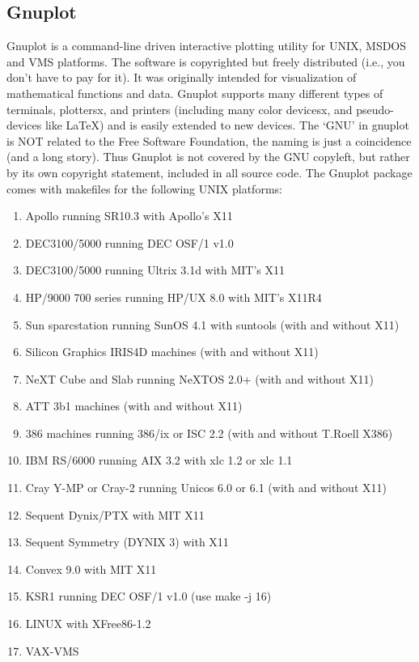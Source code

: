 \documentclass[aps,twocolumn,a4]{revtex4}
\begin{document}
\subsection{Gnuplot}
\label{gnuplot}
Gnuplot is a command-line driven interactive plotting utility
for UNIX, MSDOS and VMS platforms.  The software is copyrighted but
freely distributed (i.e., you don't have to pay for it).  It was
originally intended for
visualization of mathematical functions and data.  Gnuplot
supports many different types of terminals, plottersx, and printers
(including many color devicesx, and pseudo-devices like LaTeX) and is
easily extended to new devices. The `GNU' in gnuplot is
NOT related to the Free Software Foundation, the naming is just a
coincidence (and a long story). Thus Gnuplot is not covered by the GNU
copyleft, but rather by its own copyright statement, included in all
source code.
The Gnuplot package comes with makefiles for the following UNIX platforms:
\begin{enumerate}
\item Apollo running SR10.3 with Apollo's X11
\item DEC3100/5000 running DEC OSF/1 v1.0
\item DEC3100/5000 running Ultrix 3.1d with MIT's X11
\item HP/9000 700 series running HP/UX 8.0 with MIT's X11R4
\item Sun sparcstation running SunOS 4.1 with suntools (with and without X11)
\item Silicon Graphics IRIS4D machines (with and without X11)
\item NeXT Cube and Slab running NeXTOS 2.0+ (with and without X11)
\item ATT 3b1 machines (with and without X11)
\item 386 machines running 386/ix or ISC 2.2 (with and without T.Roell X386)
\item IBM RS/6000 running AIX 3.2 with xlc 1.2 or xlc 1.1
\item Cray Y-MP or Cray-2 running Unicos 6.0 or 6.1 (with and without X11)
\item Sequent Dynix/PTX with MIT X11
\item Sequent Symmetry (DYNIX 3) with X11
\item Convex 9.0 with MIT X11
\item KSR1 running DEC OSF/1 v1.0 (use make -j 16)
\item LINUX with XFree86-1.2
\item VAX-VMS
\end{enumerate}
\end{document}
